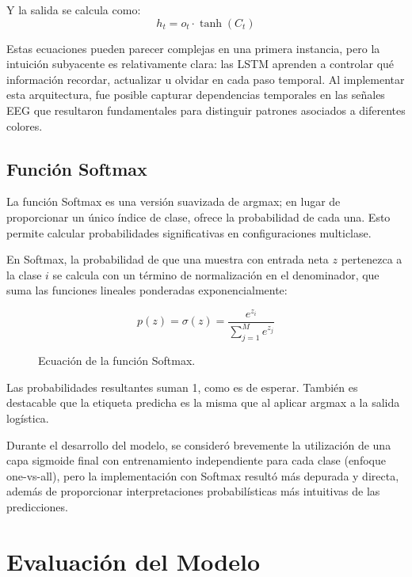 Y la salida se calcula como:
\begin{equation}
    h_t = o_t \cdot \tanh(C_t)
\end{equation}

Estas ecuaciones pueden parecer complejas en una primera instancia, pero la intuición subyacente es relativamente clara: las LSTM aprenden a controlar qué información recordar, actualizar u olvidar en cada paso temporal. Al implementar esta arquitectura, fue posible capturar dependencias temporales en las señales EEG que resultaron fundamentales para distinguir patrones asociados a diferentes colores.

\subsection{Función Softmax}
La función Softmax es una versión suavizada de argmax; en lugar de proporcionar un único índice de clase, ofrece la probabilidad de cada una. Esto permite calcular probabilidades significativas en configuraciones multiclase.

En Softmax, la probabilidad de que una muestra con entrada neta $z$ pertenezca a la clase $i$ se calcula con un término de normalización en el denominador, que suma las funciones lineales ponderadas exponencialmente:

\begin{figure}[h!]
    \centering
    \begin{equation}
        p(z) = \sigma(z) = \frac{e^{z_i}}{\sum_{j=1}^M e^{z_j}}
    \end{equation}
    \caption{Ecuación de la función Softmax.}
    \label{fig:softmax_equation}
\end{figure}

Las probabilidades resultantes suman 1, como es de esperar. También es destacable que la etiqueta predicha es la misma que al aplicar argmax a la salida logística.

Durante el desarrollo del modelo, se consideró brevemente la utilización de una capa sigmoide final con entrenamiento independiente para cada clase (enfoque one-vs-all), pero la implementación con Softmax resultó más depurada y directa, además de proporcionar interpretaciones probabilísticas más intuitivas de las predicciones.

\section{Evaluación del Modelo}

